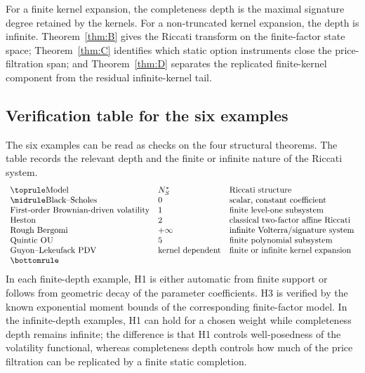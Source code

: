 \documentclass[11pt,oneside]{article}
\theoremstyle{plain}
\theoremstyle{definition}
\theoremstyle{remark}
\begin{document}
For a finite kernel expansion, the completeness depth is the maximal signature degree retained by the kernels. For a non-truncated kernel expansion, the depth is infinite. Theorem~\ref{thm:B} gives the Riccati transform on the finite-factor state space; Theorem~\ref{thm:C} identifies which static option instruments close the price-filtration span; and Theorem~\ref{thm:D} separates the replicated finite-kernel component from the residual infinite-kernel tail.



\subsection{Verification table for the six examples}
\label{subsec:example-verification-table}
The six examples can be read as checks on the four structural theorems. The table records the relevant depth and the finite or infinite nature of the Riccati system.
\[
\begin{array}{lll}
\toprule
\text{Model} & N_S^\ast & \text{Riccati structure}\\
\midrule
\text{Black--Scholes} & 0 & \text{scalar, constant coefficient}\\
\text{First-order Brownian-driven volatility} & 1 & \text{finite level-one subsystem}\\
\text{Heston} & 2 & \text{classical two-factor affine Riccati}\\
\text{Rough Bergomi} & +\infty & \text{infinite Volterra/signature system}\\
\text{Quintic OU} & 5 & \text{finite polynomial subsystem}\\
\text{Guyon--Lekeufack PDV} & \text{kernel dependent} & \text{finite or infinite kernel expansion}\\
\bottomrule
\end{array}
\]
In each finite-depth example, H1 is either automatic from finite support or follows from geometric decay of the parameter coefficients. H3 is verified by the known exponential moment bounds of the corresponding finite-factor model. In the infinite-depth examples, H1 can hold for a chosen weight while completeness depth remains infinite; the difference is that H1 controls well-posedness of the volatility functional, whereas completeness depth controls how much of the price filtration can be replicated by a finite static completion.
\end{document}
